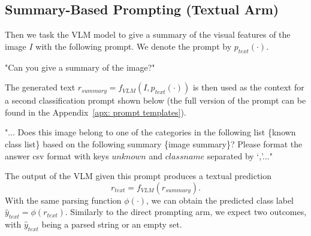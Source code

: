 \documentclass[10pt]{article} %
\begin{document}
\subsection{Summary-Based Prompting (Textual Arm)}
Then we task the VLM model to give a summary of the visual features of the image $I$ with the following prompt.
We denote the prompt by $p_{text}(\cdot)$.

\begin{promptquote}
"Can you give a summary of the image?"
\end{promptquote}

The generated text $r_{summary}=f_{VLM}(I, p_{text}(\cdot))$ is then used as the context for a second classification prompt shown below (the full version of the prompt can be found in the Appendix~\ref{apx: prompt templates}).

\begin{promptquote} \label{ptext}
"... Does this image belong to one of the categories in the following list \{known class list\} based on the following summary \{image summary\}? Please format the answer csv format with keys $unknown$ and $classname$ separated by `,'..." 
\end{promptquote} 

The output of the VLM given this prompt produces a textual prediction
%
\begin{equation}
    r_{text}=f_{VLM}(r_{summary}).
\end{equation}
%
With the same parsing function $\phi(\cdot)$, we can obtain the predicted class label $\hat{y}_{text} = \phi(r_{text})$. Similarly to the direct prompting arm, we expect two outcomes, with $\hat{y}_{text}$ being a parsed string or an empty set.
 
\end{document}
